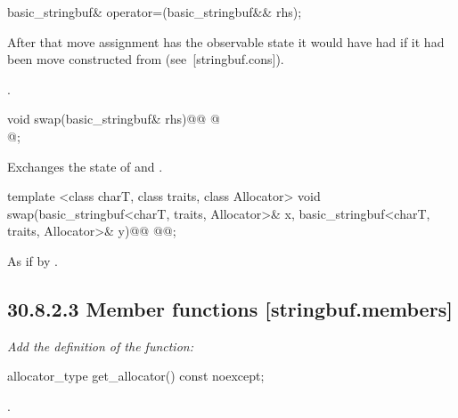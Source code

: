 \documentclass[ebook,11pt,article]{memoir}
\renewcommand{\iref}[1]{[#1]}
\begin{document}
%
\begin{itemdecl}
basic_stringbuf& operator=(basic_stringbuf&& rhs);
\end{itemdecl}

\begin{itemdescr}
\pnum
\effects {}
After that move assignment  has the observable state it would
have had if it had been move constructed from  (see~\iref{stringbuf.cons}).

\pnum
\returns {}.
\end{itemdescr}

%
\begin{itemdecl}
void swap(basic_stringbuf& rhs)@\removed{;}@
@\\
       @;
\end{itemdecl}

\begin{itemdescr}
\pnum
\effects Exchanges the state of 
and . 
\end{itemdescr}

%
\begin{itemdecl}
template <class charT, class traits, class Allocator>
  void swap(basic_stringbuf<charT, traits, Allocator>& x,
            basic_stringbuf<charT, traits, Allocator>& y)@\removed{;}@
@@;
\end{itemdecl}

\begin{itemdescr}
\pnum
\effects As if by .
\end{itemdescr}


\subsection{30.8.2.3 Member functions [stringbuf.members]}
\textit{Add the definition of the  function:}
\begin{addedblock}
\begin{itemdecl}
allocator_type get_allocator() const noexcept;
\end{itemdecl}

\begin{itemdescr}
\pnum
\returns {}.

\end{itemdescr}
\end{addedblock}
\end{document}
